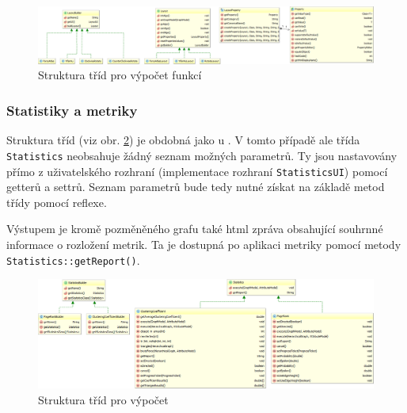 \documentclass[thesis=M,czech]{FITthesis}[2014/05/6]
\begin{document}
\begin{figure}\centering
 	\includegraphics[width=1\textwidth]{images/class-diagram/layout}
 	\caption[Struktura tříd pro výpočet funkcí ]{Struktura tříd pro výpočet funkcí }\label{fig:uml-layout}
\end{figure}



\subsubsection{Statistiky a metriky}
Struktura tříd (viz obr. \ref{fig:uml-statistics}) je obdobná jako u . V tomto případě ale třída \texttt{Statistics} neobsahuje 
žádný seznam možných parametrů. Ty jsou nastavovány přímo z uživatelského rozhraní (implementace rozhraní \texttt{StatisticsUI}) pomocí getterů a settrů.
Seznam parametrů bude tedy nutné získat na základě metod třídy pomocí reflexe.

Výstupem  je kromě pozměněného grafu také html zpráva obsahující souhrnné informace o rozložení metrik. Ta je dostupná po
aplikaci metriky pomocí metody \texttt{Statistics::getReport()}.

\begin{figure}\centering
 	\includegraphics[width=1\textwidth]{images/class-diagram/statistics}
 	\caption[Struktura tříd pro výpočet ]{Struktura tříd pro výpočet }\label{fig:uml-statistics}
\end{figure}


\end{document}
